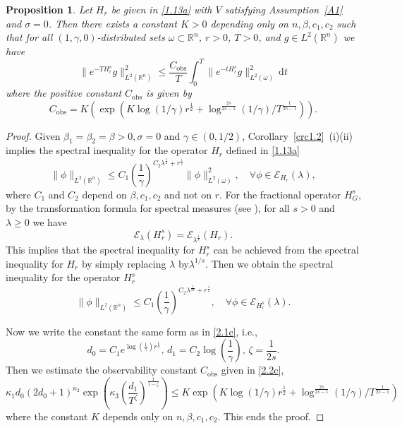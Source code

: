 \documentclass{article}
\numberwithin{equation}{section}
\renewcommand{\d}{\,\mathrm{d}}
\newcommand\R{\ensuremath{\mathbb{R}}}
\newtheorem{proposition}[theorem]{Proposition}
\numberwithin{equation}{section}
\theoremstyle{definition}
\begin{document}
\begin{proposition}\label{prp2.2}
	Let $H_r$ be given in \eqref{1.13a} with $V$ satisfying Assumption~\ref{A1} and $\sigma = 0$. Then there exists a constant $K>0$ depending only on $n,\beta,c_1,c_2$ such that for all $(1,\gamma,0)$-distributed sets $\omega\subset \R^{n}$, $r>0$, $T>0$, and  $g\in L^2(\R^{n})$ we have
	\begin{equation*}
		\|e^{-TH_{r}^{s}}g\|^2_{L^2\left( \R^{n} \right) }\le \frac{C_{\mathrm{obs}}}{T}\int_0^{T}\|e^{-t H_{r}^{s}}g\|^2_{L^2(\omega)}\d t
	\end{equation*}
	where the positive constant $C_{\mathrm{obs}}$ is given by
	\begin{equation}\label{2.7c}
		C_{\mathrm{obs}} = K\left( \exp \left( K \log(1 /\gamma)r^{\frac{1}{2}}+\log^{\frac{2s}{2s-1}}(1 /\gamma) /T^{\frac{1}{2s-1}} \right)  \right). 
	\end{equation}
\end{proposition}
\begin{proof}
	Given $\beta_1=\beta_2=\beta >0,\sigma =0$ and $\gamma\in (0,1 /2)$, Corollary~\ref{crc1.2}~(i)(ii) implies the spectral inequality for the operator $H_r$ defined in \eqref{1.13a}  
	\begin{equation*}
		\|\phi\|_{L^2\left( \R^{n} \right) }\le C_1\left( \frac{1}{\gamma} \right) ^{C_2\lambda^{\frac{1}{2}}+ r^{\frac{1}{2}}}\|\phi\|^2_{L^2(\omega)},\quad \forall \phi \in \mathcal{E}_{H_r}(\lambda),
	\end{equation*}
	where $C_1$ and $C _2$ depend on $\beta,c_1,c_2$ and not on $r$.
For the fractional operator $H_{G}^{s}$, by the transformation formula for spectral measures (see \cite[Proposition~4.24]{schmudgen2012unbounded}), for all $s>0$ and $\lambda \ge 0$ we have
\begin{equation}\label{1f}
	\mathcal{E}_\lambda(H_{r}^{s})=\mathcal{E}_{\lambda ^{\frac{1}{s}}}(H_{r}).
\end{equation}
This implies that the spectral inequality for $H_{r}^{s}$ can be achieved from the spectral inequality for $H_{r}$ by simply replacing $\lambda$ by$\lambda^{1 /s}$. Then we obtain the spectral inequality for the operator $H_r^{s}$
\[
\|\phi\|_{L^2(\R^{n})}\le C_1 \left( \frac{1}{\gamma} \right) ^{C_2 \lambda^{\frac{1}{2s}}+r^{\frac{1}{2}}},\quad \forall \phi \in \mathcal{E}_{H_r^{s}}(\lambda).
\] 

Now we write the constant the same form as in \eqref{2.1c}, i.e.,
	\[
	d_0=C_1 e^{\log\left( \frac{1}{\gamma} \right)  r^{\frac{1}{2}}},\, d_1=C_2 \log\left( \frac{1}{\gamma} \right),\, \zeta =\frac{1}{2s}.
	\]
	Then we estimate the observability constant $C_{\mathrm{obs}}$ given in \eqref{2.2c}, 
	\begin{equation*}
		\kappa_1d_0(2d_0+1)^{\kappa_2}\exp \left( \kappa_3 \left( \frac{d_1}{T^{\zeta}} \right) ^{\frac{1}{1-\zeta}} \right)\le K \exp\left( K\log\left( 1 /\gamma \right) r^{\frac{1}{2}}+ \log^{\frac{2s}{2s-1}}\left( 1 /\gamma \right) /T^{\frac{1}{2s-1}}\right)  
	\end{equation*}
where the constant $K$ depends only on $n,\beta,c_1,c_2$. This ends the proof.
\end{proof}
\end{document}
